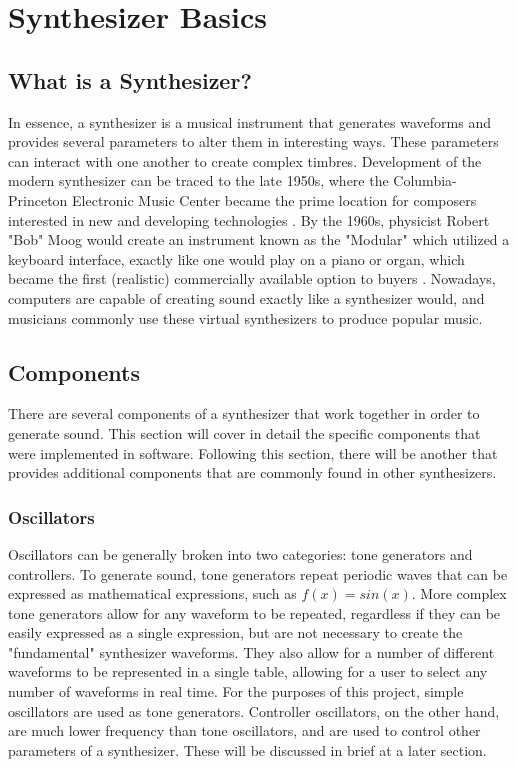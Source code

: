 \documentclass[12pt]{article}
\begin{document}
\section{Synthesizer Basics}

\subsection{What is a Synthesizer?}
In essence, a synthesizer is a musical instrument that generates waveforms and provides several parameters to alter them in interesting ways. These parameters can interact with one another to create complex timbres. Development of the modern synthesizer can be traced to the late 1950s, where the Columbia-Princeton Electronic Music Center became the prime location for composers interested in new and developing technologies \cite{Pejrolo_2017}. By the 1960s, physicist Robert "Bob" Moog would create an instrument known as the "Modular" which utilized a keyboard interface, exactly like one would play on a piano or organ, which became the first (realistic) commercially available option to buyers \cite{Pejrolo_2017}. Nowadays, computers are capable of creating sound exactly like a synthesizer would, and musicians commonly use these virtual synthesizers to produce popular music. 

\subsection{Components}
There are several components of a synthesizer that work together in order to generate sound. This section will cover in detail the specific components that were implemented in software. Following this section, there will be another that provides additional components that are commonly found in other synthesizers.

\subsubsection{Oscillators}
Oscillators can be generally broken into two categories: tone generators and controllers. To generate sound, tone generators repeat periodic waves that can be expressed as mathematical expressions, such as \(f(x) = sin(x)\). More complex tone generators allow for any waveform to be repeated, regardless if they can be easily expressed as a single expression, but are not necessary to create the "fundamental" synthesizer waveforms. They also allow for a number of different waveforms to be represented in a single table, allowing for a user to select any number of waveforms in real time. For the purposes of this project, simple oscillators are used as tone generators. Controller oscillators, on the other hand, are much lower frequency than tone oscillators, and are used to control other parameters of a synthesizer. These will be discussed in brief at a later section.
\end{document}
